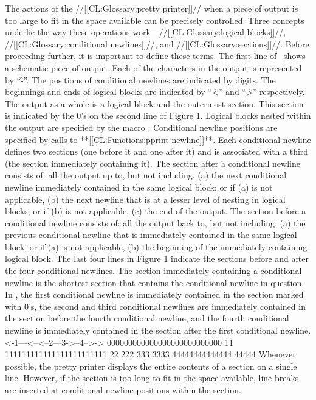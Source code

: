  
  The actions of the //[[CL:Glossary:pretty printer]]// when a piece of output is too large to fit in the space available can be precisely controlled. Three concepts underlie  the way these operations work---//[[CL:Glossary:logical blocks]]//, 			        //[[CL:Glossary:conditional newlines]]//, 			    and //[[CL:Glossary:sections]]//. Before proceeding further, it is important to define these terms.
  The first line of \thenextfigure\ shows a schematic piece of output.  Each of the characters in the output is represented by ``\f{-}''.  The positions of conditional newlines are indicated by digits.  The beginnings and ends of logical blocks are indicated by ``\f{<}'' and ``\f{>}'' respectively.
  The output as a whole is a logical block and the outermost section.  This section is indicated by the \f{0}'s on the second line of Figure 1.  Logical blocks nested within the output are specified by the macro .  Conditional newline positions are specified  by calls to **[[CL:Functions:pprint-newline]]**.  Each conditional newline defines  two sections (one before it and one after it) and is associated with a  third (the section immediately containing it).
  The section after a conditional newline consists of: all the output up to, but not including, (a) the next conditional newline immediately contained in the same logical block; or if (a) is not applicable, (b) the next newline that is at a lesser level of nesting in logical blocks; or if (b) is not applicable, (c) the end of the output.
  The section before a conditional newline consists of: all the output back to, but not including, (a) the previous conditional newline that is immediately contained in the same logical block; or if (a) is not applicable, (b) the beginning of the immediately containing logical block. The last four lines in Figure 1 indicate the sections before and after the four conditional newlines.
  The section immediately containing a conditional newline is the shortest section that contains the conditional newline in question.  In \thenextfigure, the first conditional newline is immediately contained in the section marked with \f{0}'s, the second and third conditional newlines are immediately contained in the section before the fourth conditional newline, and the fourth conditional newline is immediately contained in the section after the first conditional newline.
  \code
 <-1---<--<--2---3->--4-->->
 000000000000000000000000000
 11 111111111111111111111111
           22 222
              333 3333
        44444444444444 44444 \endcode {}
  Whenever possible, the pretty printer displays the entire contents of a section on a single line.  However, if the section is too long to fit in the space available, line breaks are inserted at conditional newline positions within the section.


